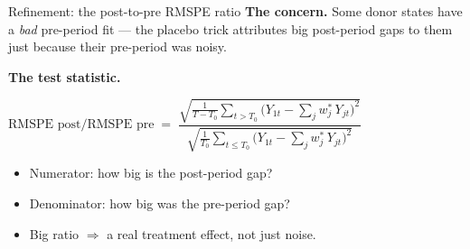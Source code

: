 \documentclass[aspectratio=169,11pt]{beamer}
\begin{document}
\begin{frame}{Refinement: the post-to-pre RMSPE ratio}
\vspace{0.5em}
\textbf{The concern.} \;Some donor states have a \textit{bad} pre-period fit --- the placebo trick attributes big post-period gaps to them just because their pre-period was noisy.

\vspace{0.5em}
\textbf{The test statistic.} \;
\begin{center}\small
$\text{RMSPE post}/\text{RMSPE pre} \;=\; \dfrac{\sqrt{\frac{1}{T - T_0}\sum_{t > T_0}\big(Y_{1t} - \sum_j w_j^{*}\, Y_{jt}\big)^2}}{\sqrt{\frac{1}{T_0}\sum_{t \leq T_0}\big(Y_{1t} - \sum_j w_j^{*}\, Y_{jt}\big)^2}}$
\end{center}

\vspace{0.5em}
\begin{itemize}\small
  \item Numerator: how big is the post-period gap?
  \item Denominator: how big was the pre-period gap?
  \item Big ratio $\Rightarrow$ a real treatment effect, not just noise.
\end{itemize}

\vspace{0.4em}
\end{frame}

\end{document}
